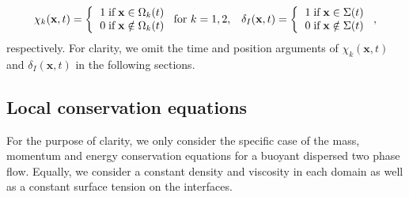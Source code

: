 \begin{align}
    \chi_k(\textbf{x},t) =  \left\{
      \begin{tabular}{cc}
        $1 \;\text{if} \;\textbf{x} \in \Omega_k(t)$\\
        $0 \;\text{if} \;\textbf{x} \notin \Omega_k(t)$
      \end{tabular}
      \right.
      \text{for $k = 1,2$},
    && \delta_I(\textbf{x},t) =  \left\{
      \begin{tabular}{cc}
        $1 \;\text{if} \;\textbf{x} \in \Sigma(t)$\\
        $0 \;\text{if} \;\textbf{x} \notin \Sigma(t)$
      \end{tabular}
      \right.,
      \label{eq:PIF}
\end{align}
respectively. 
For clarity, we omit the time and position arguments of $\chi_k(\textbf{x},t)$ and $\delta_I(\textbf{x},t)$ in the following sections. 

\subsection{Local conservation equations}
\label{sec:local_eq}

For the purpose of clarity, we only consider the specific case of the mass, momentum and energy conservation equations for a buoyant dispersed two phase flow.
Equally, we consider a constant density and viscosity in each domain as well as a constant surface tension on the interfaces.


